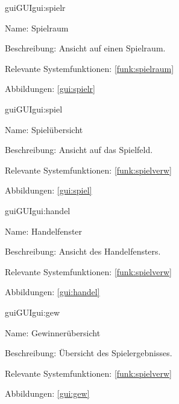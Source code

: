 \begin{description}[leftmargin=5em, style=sameline]	
	\begin{lhp}{gui}{GUI}{gui:spielr}
		\item[Name:] Spielraum
		\item[Beschreibung:] Ansicht auf einen Spielraum.
		\item[Relevante Systemfunktionen:] \ref{funk:spielraum}
		\item[Abbildungen:] \ref{gui:spielr}
	\end{lhp}
\end{description}

\begin{description}[leftmargin=5em, style=sameline]	
	\begin{lhp}{gui}{GUI}{gui:spiel}
		\item[Name:] Spielübersicht
		\item[Beschreibung:] Ansicht auf das Spielfeld.
		\item[Relevante Systemfunktionen:] \ref{funk:spielverw}
		\item[Abbildungen:] \ref{gui:spiel}
	\end{lhp}
\end{description}

\begin{description}[leftmargin=5em, style=sameline]	
	\begin{lhp}{gui}{GUI}{gui:handel}
		\item[Name:] Handelfenster
		\item[Beschreibung:] Ansicht des Handelfensters.
		\item[Relevante Systemfunktionen:] \ref{funk:spielverw}
		\item[Abbildungen:] \ref{gui:handel}
	\end{lhp}
\end{description}

\begin{description}[leftmargin=5em, style=sameline]	
	\begin{lhp}{gui}{GUI}{gui:gew}
		\item[Name:] Gewinnerübersicht
		\item[Beschreibung:] Übersicht des Spielergebnisses.
		\item[Relevante Systemfunktionen:] \ref{funk:spielverw}
		\item[Abbildungen:] \ref{gui:gew}
	\end{lhp}
\end{description}

